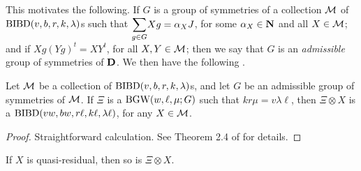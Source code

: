 \documentclass[../../../main]{subfiles}
\begin{document}
 This motivates the following. If $G$ is a group of symmetries of a collection
 $\mathcal{M}$ of $\text{BIBD}(v,b,r,k,\lambda)$s such that $\ssum_{g \in G}Xg = \alpha_XJ$,
 for some $\alpha_X \in \mathbf{N}$ and all $X \in \mathcal{M}$; and if $Xg(Yg)^t = XY^t$, for
 all $X,Y \in \mathcal{M}$; then we say that $G$ is an {\it admissible} group of
 symmetries of $\mathbf{D}$. We then have the
 following \cite[see][]{ionin-bgw-bibd}. 
 
 \begin{thm}\label{bibd-bgw-thm}
  Let $\mathcal{M}$ be a collection of $\text{BIBD}(v,b,r,k,\lambda)$s, and let $G$ be an admissible group of symmetries of $\mathcal{M}$. If $\Xi$ is a $\text{BGW}(w,\ell,\mu;G)$ such that $kr\mu=v\lambda\ell$, then $\Xi \otimes X$ is a $\text{BIBD}(vw,bw,r\ell,k\ell,\lambda\ell)$, for any $X \in \mathcal{M}$.
 \end{thm}
 
 \begin{proof}
  Straightforward calculation. See Theorem 2.4 of \cite{ionin-bgw-bibd} for details.
 \end{proof}
 
 \begin{cor}
  If $X$ is quasi-residual, then so is $\Xi \otimes X$.
 \end{cor}
 
\end{document}
